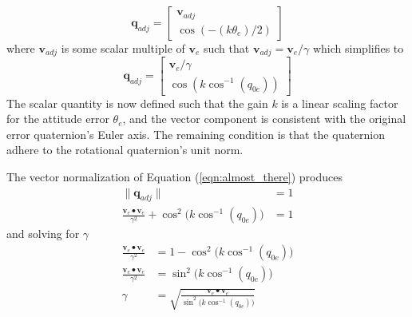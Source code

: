 \documentclass[]{aiaa-tc}%
\newcommand{\bs}[1]{\boldsymbol{#1}}
\begin{document}
\begin{equation}
  \bs{q}_{adj} = \begin{bmatrix} \bs{v}_{adj} \\ \cos(-(k\theta_e) / 2) \end{bmatrix}
\end{equation}
where $\bs{v}_{adj}$ is some scalar multiple of $\bs{v}_e$ such that $\bs{v}_{adj} = \bs{v}_{e} / \gamma$ which simplifies to
\begin{equation}
  \bs{q}_{adj} = \begin{bmatrix} \bs{v}_{e} / \gamma \\ \cos( k \cos^{-1} (q_{0e})) \end{bmatrix}
  \label{eqn:almost_there}
\end{equation}
The scalar quantity is now defined such that the gain $k$ is a linear scaling factor for the attitude error $\theta_e$, and the vector component is consistent with the original error quaternion's Euler axis.  The remaining condition is that the quaternion adhere to the rotational quaternion's unit norm.

The vector normalization of Equation (\ref{eqn:almost_there}) produces
\begin{subequations}
  \begin{align}
    \| \bs{q}_{adj} \| &= 1 \\
    \frac{\bs{v}_e \bullet \bs{v}_e}{\gamma^2} + \cos^2 \big( k \cos^{-1} (q_{0e}) \big) &= 1
  \end{align}
\end{subequations}
and solving for $\gamma$
\begin{subequations}
  \begin{align}
    \frac{\bs{v}_e \bullet \bs{v}_e}{\gamma^2}  &= 1 - \cos^2 \big( k \cos^{-1} (q_{0e}) \big)\\
    \frac{\bs{v}_e \bullet \bs{v}_e}{\gamma^2}  &= \sin^2 \big( k \cos^{-1} (q_{0e}) \big)\\
    \gamma &= \sqrt{\frac{\bs{v}_e \bullet \bs{v}_e}{\sin^2 \big( k \cos^{-1} (q_{0e}) \big)}}
  \end{align}
\end{subequations}
\end{document}
